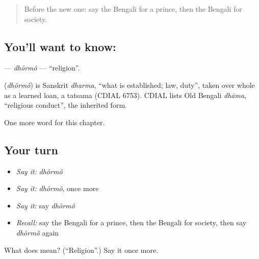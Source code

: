 \begin{quote}
Before the new one: say the Bengali for a prince, then the Bengali for society.
\end{quote}

\subsection*{You'll want to know: }
\textbf{} — \emph{dhôrmô} — \textquotedblleft{}religion\textquotedblright{}.

\begin{cousinweb}
\textbf{} (\emph{dhôrmô}) is Sanskrit \emph{dharma}, \textquotedblleft{}what is established; law, duty\textquotedblright{}, taken over whole as a learned loan, a tatsama (CDIAL 6753). CDIAL lists Old Bengali \emph{dhāma}, \textquotedblleft{}religious conduct\textquotedblright{}, the inherited form.
\end{cousinweb}

\begin{grammarlens}[title={What you've built}]
One more word for this chapter.
\end{grammarlens}

\subsection*{Your turn}
\begin{itemize}
\raggedright
  \item \emph{Say it:} \emph{dhôrmô}
  \item \emph{Say it:} \emph{dhôrmô}, once more
  \item \emph{Say it:} say \emph{dhôrmô}
  \item \emph{Recall:} say the Bengali for a prince, then the Bengali for society, then say \emph{dhôrmô} again
\end{itemize}

\begin{tcolorbox}[breakable,colback=teal!4,colframe=teal!35!black,title={Before you move on}]
What does  mean? (\textquotedblleft{}Religion\textquotedblright{}.) Say it once more.
\end{tcolorbox}
